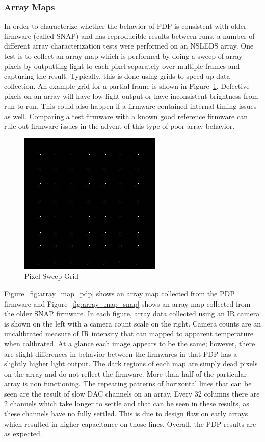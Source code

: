         \subsubsection {Array Maps}
            In order to characterize whether the behavior of PDP is consistent with older firmware (called SNAP) and has reproducible results between runs, a number of different array characterization tests were performed on an NSLEDS array. One test is to collect an array map which is performed by doing a sweep of array pixels by outputting light to each pixel separately over multiple frames and capturing the result. Typically, this is done using grids to speed up data collection. An example grid for a partial frame is shown in Figure~\ref{fig:grid_sweep}. Defective pixels on an array will have low light output or have inconsistent brightness from run to run. This could also happen if a firmware contained internal timing issues as well. Comparing a test firmware with a known good reference firmware can rule out firmware issues in the advent of this type of poor array behavior.

            \begin{figure}[t]
                \centering
                \includegraphics{fig/grid.jpg}
                \caption{Pixel Sweep Grid}
                \label{fig:grid_sweep}
            \end{figure}

            Figure~\ref{fig:array_map_pdp} shows an array map collected from the PDP firmware and Figure~\ref{fig:array_map_snap} shows an array map collected from the older SNAP firmware. In each figure, array data collected using an IR camera is shown on the left with a camera count scale on the right. Camera counts are an uncalibrated measure of IR intensity that can mapped to apparent temperature when calibrated. At a glance each image appears to be the same; however, there are slight differences in behavior between the firmwares in that PDP has a slightly higher light output. The dark regions of each map are simply dead pixels on the array and do not reflect the firmware. More than half of the particular array is non functioning. The repeating patterns of horizontal lines that can be seen are the result of slow DAC channels on an array. Every 32 columns there are 2 channels which take longer to settle and that can be seen in these results, as these channels have no fully settled. This is due to design flaw on early arrays which resulted in higher capacitance on those lines. Overall, the PDP results are as expected.

